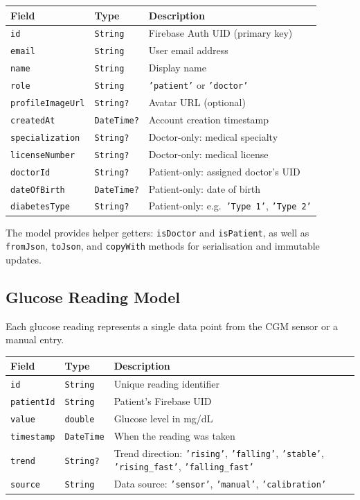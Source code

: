 \documentclass[12pt,a4paper]{article}
\begin{document}
\begin{longtable}{p{3.5cm} p{3cm} p{8cm}}
\toprule
\textbf{Field} & \textbf{Type} & \textbf{Description} \\
\midrule
\endhead
\texttt{id} & \texttt{String} & Firebase Auth UID (primary key) \\
\texttt{email} & \texttt{String} & User email address \\
\texttt{name} & \texttt{String} & Display name \\
\texttt{role} & \texttt{String} & \texttt{'patient'} or \texttt{'doctor'} \\
\texttt{profileImageUrl} & \texttt{String?} & Avatar URL (optional) \\
\texttt{createdAt} & \texttt{DateTime?} & Account creation timestamp \\
\texttt{specialization} & \texttt{String?} & Doctor-only: medical specialty \\
\texttt{licenseNumber} & \texttt{String?} & Doctor-only: medical license \\
\texttt{doctorId} & \texttt{String?} & Patient-only: assigned doctor's UID \\
\texttt{dateOfBirth} & \texttt{DateTime?} & Patient-only: date of birth \\
\texttt{diabetesType} & \texttt{String?} & Patient-only: e.g.\ \texttt{'Type 1'}, \texttt{'Type 2'} \\
\bottomrule
\end{longtable}

The model provides helper getters: \texttt{isDoctor} and \texttt{isPatient}, as well as \texttt{fromJson}, \texttt{toJson}, and \texttt{copyWith} methods for serialisation and immutable updates.

\subsection{Glucose Reading Model}

Each glucose reading represents a single data point from the CGM sensor or a manual entry.

\begin{longtable}{p{3.5cm} p{3cm} p{8cm}}
\toprule
\textbf{Field} & \textbf{Type} & \textbf{Description} \\
\midrule
\endhead
\texttt{id} & \texttt{String} & Unique reading identifier \\
\texttt{patientId} & \texttt{String} & Patient's Firebase UID \\
\texttt{value} & \texttt{double} & Glucose level in mg/dL \\
\texttt{timestamp} & \texttt{DateTime} & When the reading was taken \\
\texttt{trend} & \texttt{String?} & Trend direction: \texttt{'rising'}, \texttt{'falling'}, \texttt{'stable'}, \texttt{'rising\_fast'}, \texttt{'falling\_fast'} \\
\texttt{source} & \texttt{String} & Data source: \texttt{'sensor'}, \texttt{'manual'}, \texttt{'calibration'} \\
\bottomrule
\end{longtable}
\end{document}
